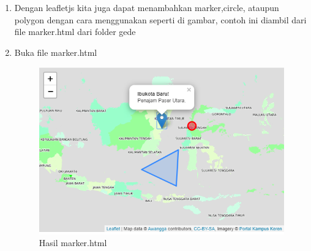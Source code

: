 \begin{enumerate}
	\item Dengan leafletjs kita juga dapat menambahkan marker,circle, ataupun polygon dengan cara menggunakan seperti di gambar, contoh ini diambil
          dari file marker.html dari folder gede 
    \hfill\break
	
	\item Buka file marker.html
    \hfill\break
	\begin{figure}[H]
		\includegraphics[width=12cm]{figures/Tugas5/1174091/4.png}
		\centering
		\caption{Hasil marker.html}
	\end{figure}
\end{enumerate}

  